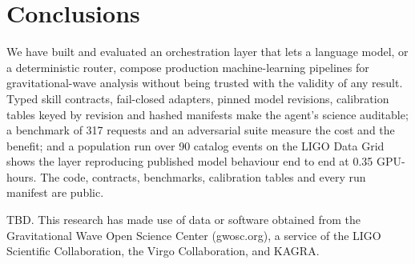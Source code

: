 \documentclass[twocolumn]{aastex631}
\begin{document}
\section{Conclusions}
\label{sec:conclusions}

We have built and evaluated an orchestration layer that lets a language
model, or a deterministic router, compose production machine-learning
pipelines for gravitational-wave analysis without being trusted with the
validity of any result. Typed skill contracts, fail-closed adapters,
pinned model revisions, calibration tables keyed by revision and hashed
manifests make the agent's science auditable; a benchmark of 317 requests
and an adversarial suite measure the cost and the benefit; and a
population run over 90 catalog events on the LIGO Data Grid shows the
layer reproducing published model behaviour end to end at 0.35
GPU-hours. The code, contracts, benchmarks, calibration tables and every
run manifest are public.

\begin{acknowledgments}
TBD. This research has made use of data or software obtained from the Gravitational Wave Open Science Center (gwosc.org), a service of the LIGO Scientific Collaboration, the Virgo Collaboration, and KAGRA.
\end{acknowledgments}




\end{document}

